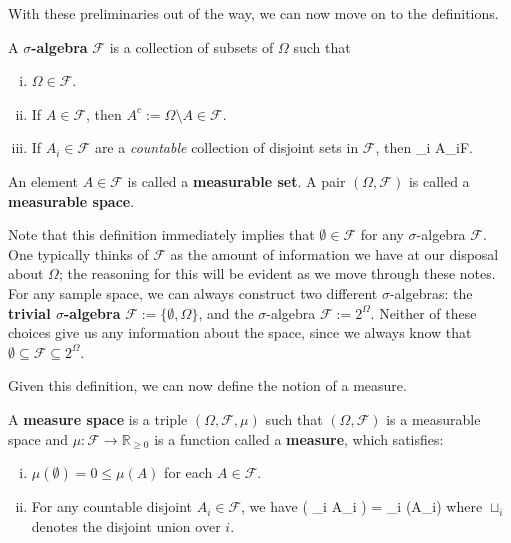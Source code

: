 With these preliminaries out of the way, we can now move on to the definitions. 
\begin{definition}
A \textbf{$\sigma$-algebra} $\mathcal F$ is a collection of subsets of $\Omega$ such that
\begin{enumerate}[i)]
	\item $\Omega\in\mathcal F$.
	\item If $A\in\mathcal F$, then $A^c := \Omega\setminus A\in \mathcal F$. 
	\item If $A_i\in\mathcal F$ are a \textit{countable} collection of disjoint sets in $\mathcal F$, then
	\eq
		\bigcup_i A_i\in \mathcal F.
	\qe
\end{enumerate}
An element $A\in\mathcal F$ is called a \textbf{measurable set}. A pair $(\Omega, \mathcal F)$ is called a \textbf{measurable space}.
\end{definition}
Note that this definition immediately implies that $\emptyset\in\mathcal F$ for any $\sigma$-algebra $\mathcal F$. One typically thinks of $\mathcal F$ as the amount of information we have at our disposal about $\Omega$; the reasoning for this will be evident as we move through these notes. For any sample space, we can always construct two different $\sigma$-algebras: the \textbf{trivial $\sigma$-algebra} $\mathcal F := \{\emptyset, \Omega\}$, and the $\sigma$-algebra $\mathcal F := 2^\Omega$. Neither of these choices give us any information about the space, since we always know that $\emptyset\subseteq\mathcal F\subseteq 2^\Omega$. 

Given this definition, we can now define the notion of a measure. 
\begin{definition}
	A \textbf{measure space} is a triple $(\Omega, \mathcal F, \mu)$ such that $(\Omega, \mathcal F)$ is a measurable space and $\mu : \mathcal F\rightarrow\mathbb R_{\geq 0}$ is a function called a \textbf{measure}, which satisfies:
	\begin{enumerate}[i)]
		\item $\mu(\emptyset) = 0\leq \mu(A)$ for each $A\in\mathcal F$. 
		\item For any countable disjoint $A_i\in\mathcal F$, we have
		\eq
			\mu\left( \bigsqcup_i A_i \right) = \sum_i \mu(A_i)
		\qe
		where $\sqcup_i$ denotes the disjoint union over $i$.
	\end{enumerate}
\end{definition}

